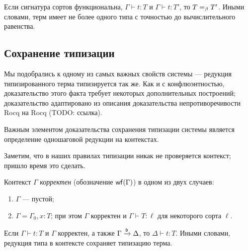 \begin{theorem}
Если сигнатура сортов функциональна,
$\Gamma \vdash t : T$ и
$\Gamma \vdash t : T'$, то $T =_{\beta} T'$.
Иными словами, терм имеет не более одного типа
с точностью до вычислительного равенства.
\end{theorem}

\subsection{Сохранение типизации}

Мы подобрались к одному из самых важных свойств системы
--- редукция типизированного терма типизируется так же.
Как и с конфлюэнтностью, доказательство этого факта
требует некоторых дополнительных построений;
доказательство адаптировано из описания доказательства
непротиворечивости Rocq на Rocq (TODO: ссылка).

Важным элементом доказательства сохранения типизации
системы является определение одношаговой редукции на
контекстах.

\begin{definition}
\end{definition}

Заметим, что в наших правилах типизации никак не
проверяется контекст; пришло время это сделать.

\begin{definition}
Контекст $\Gamma$ \emph{корректен}
(обозначение $\mathsf{wf}(\Gamma)$) в одном из двух случаев:
\begin{enumerate}
    \item $\Gamma$ --- пустой;
    \item $\Gamma=\Gamma_0,x:T$; при этом $\Gamma$
        корректен и $\Gamma \vdash T : \ell$ для
        некоторого сорта $\ell$.
\end{enumerate}
\end{definition}

\begin{lemma}
Если $\Gamma \vdash t : T$ и $\Gamma$ корректен, а
также $\Gamma \xrightarrow{\mathfrak{b}} \Delta$, то
$\Delta \vdash t : T$.
Иными словами, редукция типа в контексте
сохраняет типизацию терма.
\end{lemma}

